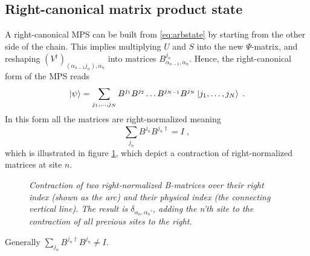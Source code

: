 \subsection{Right-canonical matrix product state}
A right-canonical MPS can be built from \ref{eq:arbstate} by starting from the other side of the chain. This implies multiplying $U$ and $S$ into the new $\Psi$-matrix, and reshaping $(V^{\dag})_{(\alpha_{n-1} j_n), \alpha_n}$ into matrices $B_{\alpha_{n-1} , \alpha_n}^{j_n}$. Hence, the right-canonical form of the MPS reads
\begin{equation}
	\ket{\psi} = \sum_{j_1, \ldots, j_N} B^{j_1} B^{j_2} \ldots B^{j_{N-1}} B^{j_{N}} \ket{j_1, \ldots, j_N} \; .
\label{eq:MPS_RC}	 
\end{equation}
In this form all the matrices are right-normalized meaning 
\begin{equation}
	\sum_{j_n} B^{j_n} B^{j_n \dag} = I \; ,
	\label{eq:RC_ident}
\end{equation}
which is illustrated in figure \ref{fig:rightNorm}, which depict a contraction of right-normalized matrices at site $n$. 
\begin{figure}[h!]
	\centering
	
	\caption{\textit{Contraction of two right-normalized B-matrices over their right index (shown as the arc) and their physical index (the connecting vertical line). The result is $\delta_{\alpha_n , \alpha_n'}$, adding the n'th site to the contraction of all previous sites to the right.}}
	\label{fig:rightNorm}
\end{figure}
Generally $\sum_{j_n} B^{j_n \dag} B^{j_n} \neq I$.

